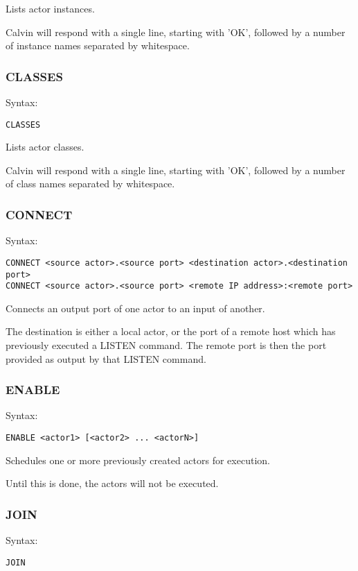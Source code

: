 \documentclass[10pt, a4paper]{article}
\begin{document}
Lists actor instances.

Calvin will respond with a single line, starting with 'OK', followed by a number of instance names separated by whitespace.

\subsubsection*{CLASSES}

Syntax:
\begin{verbatim}
CLASSES
\end{verbatim}

Lists actor classes.

Calvin will respond with a single line, starting with 'OK', followed by a number of class names separated by whitespace.

\subsubsection*{CONNECT}

Syntax:
\begin{verbatim}
CONNECT <source actor>.<source port> <destination actor>.<destination port>
CONNECT <source actor>.<source port> <remote IP address>:<remote port>
\end{verbatim}

Connects an output port of one actor to an input of another.

The destination is either a local actor, or the port of a remote host which has previously executed a LISTEN command. The remote port is then the port provided as output by that LISTEN command.

\subsubsection*{ENABLE}

Syntax:
\begin{verbatim}
ENABLE <actor1> [<actor2> ... <actorN>]
\end{verbatim}

Schedules one or more previously created actors for execution.

Until this is done, the actors will not be executed.

\subsubsection*{JOIN}

Syntax:
\begin{verbatim}
JOIN
\end{verbatim}
\end{document}

